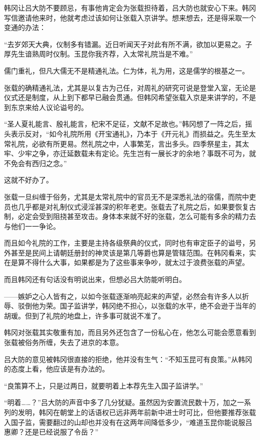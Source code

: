 韩冈让吕大防不要顾忌，有事他肯定会为张载担待着，吕大防也就安心下来。韩冈写信邀请他来时，他就考虑过该如何让张载入京讲学。想来想去，还是得采取一个变通的办法：

“去岁郊天大典，仪制多有错漏。近日听闻天子对此有所不满，欲加以更易之。子厚先生谙熟周时仪制。玉昆你我齐荐，入太常礼院当是不难。”

儒门重礼，但凡大儒无不是精通礼法。仁为体，礼为用，这是儒学的根基之一。

张载的确精通礼法，尤其是以复古为己任，对周礼的研究可说是登堂入室，无论是仪式还是制度，从上到下都早已融会贯通。但韩冈希望张载入京是来讲学的，不是到东京来给人议论谥号的。

“圣人夏礼能言、殷礼能言，杞宋不足征，文献不足故也。”韩冈想了一阵之后，摇头表示反对，“如今礼院所用《开宝通礼》，乃本于《开元礼》而损益之。先生至太常礼院，必欲有所更易。然礼院之中，人事繁芜，言出多头。四季祭星主，其太牢、少牢之争，亦迁延数载未有定论。先生岂有一展长才的余地？事既不可为，就不免会有西归之念。”

这就不好办了。

张载一旦纠缠于俗务，尤其是太常礼院中的官员无不是深悉礼法的宿儒，而院中吏员也几乎都是对礼制仪式浸淫甚深的积年老吏。张载去了礼院之后，如果要恢复古制，必定会受到阻挠甚至攻击。身体本来就不好的张载，怎么可能有多余的精力去与他们一一争论。

而且如今礼院的工作，主要是主持各级祭典的仪式，同时也有审定臣子的谥号，另外甚至是民间上请朝廷册封的神灵该是第几等爵也算是管辖范围。在韩冈看来，实在是算不得什么大事，如果都是为了这些事来争吵，就太过于浪费张载的声望。

而且韩冈还有句话没有明说出来，但想必吕大防能听明白。

——嫉妒之心人皆有之，以如今张载逐渐响亮起来的声望，必然会有许多人以折辱、驳倒他为荣。国子监讲学，韩冈绝不担心，以张载的水平，绝不会逊于当年的胡瑗。但到了礼院的地盘上，许多事可就说不准了。

韩冈对张载其实敬重有加，而且另外还包含了一份私心在，他怎么可能会愿意看到张载被俗务所缠，失去了进京的本意。

吕大防的意见被韩冈很直接的拒绝，他并没有生气：“不知玉昆可有良策。”从韩冈的态度上看，他应该是有办法的。

“良策算不上，只是过两日，就要明着上本荐先生入国子监讲学。”

“明着……？”吕大防的声音中多了几分犹疑。虽然因为安置流民数十万，加之一系列的发明，韩冈在朝堂上的话语权已远非两年前新中进士时可比，但他要推荐张载入国子监，需要翻过的山却也并没有在这两年间降低多少，“难道玉昆你能说服吕惠卿？还是已经说服了令岳？”


